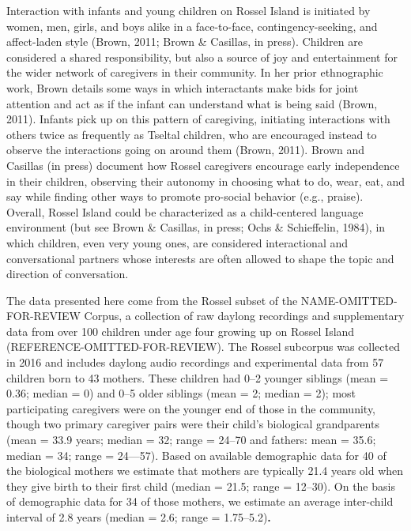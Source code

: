 \documentclass[,man,floatsintext]{apa6}
\begin{document}
Interaction with infants and young children on Rossel Island is
initiated by women, men, girls, and boys alike in a face-to-face,
contingency-seeking, and affect-laden style (Brown, 2011; Brown \&
Casillas, in press). Children are considered a shared responsibility,
but also a source of joy and entertainment for the wider network of
caregivers in their community. In her prior ethnographic work, Brown
details some ways in which interactants make bids for joint attention
and act as if the infant can understand what is being said (Brown,
2011). Infants pick up on this pattern of caregiving, initiating
interactions with others twice as frequently as Tseltal children, who
are encouraged instead to observe the interactions going on around them
(Brown, 2011). Brown and Casillas (in press) document how Rossel
caregivers encourage early independence in their children, observing
their autonomy in choosing what to do, wear, eat, and say while finding
other ways to promote pro-social behavior (e.g., praise). Overall,
Rossel Island could be characterized as a child-centered language
environment (but see Brown \& Casillas, in press; Ochs \& Schieffelin,
1984), in which children, even very young ones, are considered
interactional and conversational partners whose interests are often
allowed to shape the topic and direction of conversation.

The data presented here come from the Rossel subset of the
NAME-OMITTED-FOR-REVIEW Corpus, a collection of raw daylong recordings
and supplementary data from over 100 children under age four growing up
on Rossel Island (REFERENCE-OMITTED-FOR-REVIEW). The Rossel subcorpus
was collected in 2016 and includes daylong audio recordings and
experimental data from 57 children born to 43 mothers. These children
had 0--2 younger siblings (mean = 0.36; median = 0) and 0--5 older
siblings (mean = 2; median = 2); most participating caregivers were on
the younger end of those in the community, though two primary caregiver
pairs were their child's biological grandparents (mean = 33.9 years;
median = 32; range = 24--70 and fathers: mean = 35.6; median = 34; range
= 24---57). Based on available demographic data for 40 of the biological
mothers we estimate that mothers are typically 21.4 years old when they
give birth to their first child (median = 21.5; range = 12--30). On the
basis of demographic data for 34 of those mothers, we estimate an
average inter-child interval of 2.8 years (median = 2.6; range =
1.75--5.2)\textbf{.}
\end{document}
